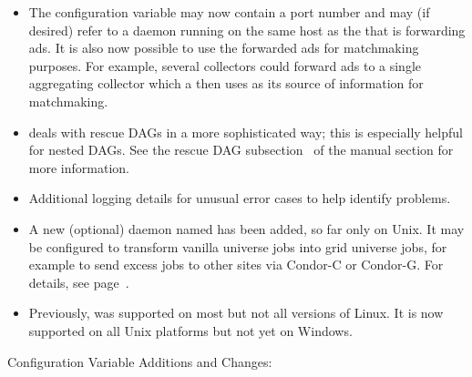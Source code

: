 \begin{itemize}
\item The configuration variable  may now
  contain a port number and may (if desired) refer to a
   daemon running on the same host as the
   that is forwarding ads.  It is also now possible to
  use the forwarded ads for matchmaking purposes.  For example, several
  collectors could forward ads to a single aggregating collector which
  a  then uses as its source of information for
  matchmaking.

\item {} deals with rescue DAGs in a more sophisticated
way; this is especially helpful for nested DAGs.
See the rescue DAG subsection~\pageref{sec:DAGMan-rescue} of the 
manual section for more information.

\item Additional logging details for unusual error cases to help 
identify problems.

\item A new (optional) daemon named  has been
added, so far only on Unix.  It may be configured to transform vanilla
universe jobs into grid universe jobs, for example to send excess jobs
to other sites via Condor-C or Condor-G.  For details, see
page~\pageref{sec:JobRouter}.

\item Previously,   was supported on most
but not all versions of Linux.  It is now supported on all Unix platforms
but not yet on Windows.

\end{itemize}

\noindent Configuration Variable Additions and Changes:

